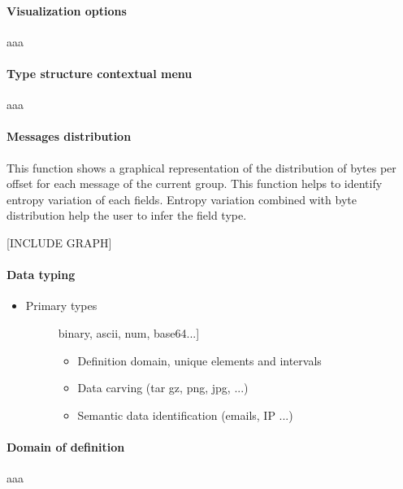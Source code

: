 \documentclass[letterpaper,10pt,english]{sphinxmanual}
\begin{document}
\paragraph{Visualization options}
\label{modelization/vocabular:visualization-options}
aaa


\paragraph{Type structure contextual menu}
\label{modelization/vocabular:type-structure-contextual-menu}
aaa


\paragraph{Messages distribution}
\label{modelization/vocabular:messages-distribution}
This function shows a graphical representation of the distribution of bytes per offset for each message of the current group. This function helps to identify entropy variation of each fields. Entropy variation combined with byte distribution help the user to infer the field type.

{[}INCLUDE GRAPH{]}


\paragraph{Data typing}
\label{modelization/vocabular:data-typing}\begin{itemize}
\item {} \begin{description}
\item[{Primary types}] \leavevmode{[}binary, ascii, num, base64...{]}\begin{itemize}
\item {} 
Definition domain, unique elements and intervals

\item {} 
Data carving (tar gz, png, jpg, ...)

\item {} 
Semantic data identification (emails, IP ...)

\end{itemize}

\end{description}

\end{itemize}


\paragraph{Domain of definition}
\label{modelization/vocabular:domain-of-definition}
aaa
\end{document}
